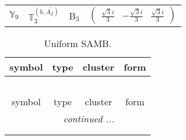 \documentclass[fleqn,10pt,landscape]{article}
\begin{document}
\begin{itemize}
\begin{center}
\begin{longtable}{c|c|c|c}
$ \mathbb{Y}_{9} $ & $\mathbb{T}_{3}^{(b,A_{2}^{\prime})}$ & B$_{3}$ & $\begin{pmatrix} \frac{\sqrt{3} i}{3} & - \frac{\sqrt{3} i}{3} & \frac{\sqrt{3} i}{3} \end{pmatrix}$ \\
\end{longtable}
\end{center}
\begin{center}
\renewcommand{\arraystretch}{1.3}
\begin{longtable}{c|c|c|c}
\caption{Uniform SAMB.}
 \\
 \hline \hline
symbol & type & cluster & form \\ \hline \endfirsthead

\multicolumn{3}{l}{\tablename\ \thetable{}} \\
 \hline \hline
symbol & type & cluster & form \\ \hline \endhead

 \hline \hline
\multicolumn{3}{r}{\footnotesize\it continued ...} \\ \endfoot

 \hline \hline
\multicolumn{3}{r}{} \\ \endlastfoot


\end{longtable}
\end{center}
\end{itemize}
\end{document}
